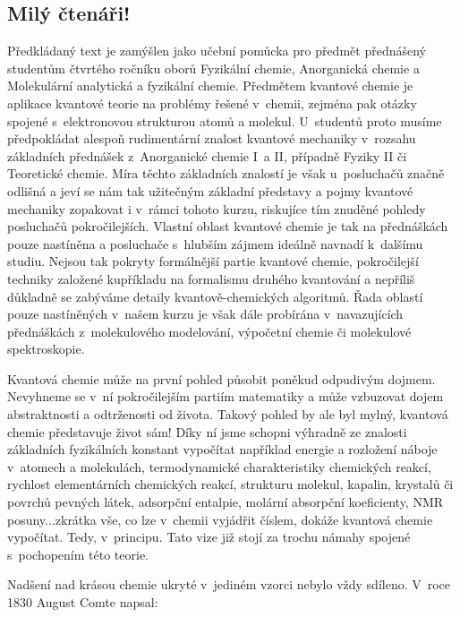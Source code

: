 \subsection{Milý čtenáři!}
Předkládaný text je zamýšlen jako učební pomůcka pro předmět  přednášený studentům čtvrtého ročníku oborů Fyzikální chemie, Anorganická chemie a Molekulární analytická a fyzikální chemie. Předmětem kvantové chemie je aplikace kvantové teorie na problémy řešené v~chemii, zejména pak otázky spojené s~elektronovou strukturou atomů a molekul. U~studentů proto musíme předpokládat alespoň rudimentární znalost kvantové mechaniky v~rozsahu základních přednášek z~Anorganické chemie I~a II, případně Fyziky II či Teoretické chemie. Míra těchto základních znalostí je však u~posluchačů značně odlišná a jeví se nám tak užitečným základní představy a pojmy kvantové mechaniky zopakovat i v~rámci tohoto kurzu, riskujíce tím znuděné pohledy posluchačů pokročilejších. Vlastní oblast kvantové chemie je tak na přednáškách pouze nastíněna a posluchače s~hlubším zájmem ideálně navnadí k~dalšímu studiu. Nejsou tak pokryty formálnější partie kvantové chemie, pokročilejší techniky založené kupříkladu na formalismu druhého kvantování a nepříliš důkladně se zabýváme detaily kvantově-chemických algoritmů. Řada oblastí pouze nastíněných v~našem kurzu je však dále probírána v~navazujících přednáškách z~molekulového modelování, výpočetní chemie či molekulové spektroskopie.

Kvantová chemie může na první pohled působit poněkud odpudivým dojmem. Nevyhneme se v~ní pokročilejším partiím matematiky a může vzbuzovat dojem abstraktnosti a odtrženosti od života. Takový pohled by ale byl mylný, kvantová chemie představuje život sám! Díky ní jsme schopni výhradně ze znalosti základních fyzikálních konstant vypočítat například energie a rozložení náboje v~atomech a molekulách, termodynamické charakteristiky chemických reakcí, rychlost elementárních chemických reakcí, strukturu molekul, kapalin, krystalů či povrchů pevných látek, adsorpční entalpie, molární absorpční koeficienty, NMR posuny...zkrátka vše, co lze v~chemii vyjádřit číslem, dokáže kvantová chemie vypočítat. Tedy, v~principu. Tato vize již stojí za trochu námahy spojené s~pochopením této teorie. 

Nadšení nad krásou chemie ukryté v~jediném vzorci nebylo vždy sdíleno. V~roce 1830 August Comte napsal:

\bigskip


